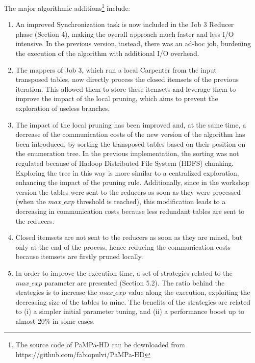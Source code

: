 \documentclass[12pt, onecolumn,letterpaper]{article}
\begin{document}
The major algorithmic additions\footnote{The source code of PaMPa-HD can be downloaded from https://github.com/fabiopulvi/PaMPa-HD} include:
\begin{enumerate}
\item An improved Synchronization task is now included in the Job 3 Reducer
phase (Section 4), making the overall approach much faster and less I/O
intensive.
In the previous version, instead, there was an ad-hoc job, burdening the
execution of the algorithm with additional I/O overhead.
\item The mappers of Job 3, which run a local Carpenter from the input
transposed tables, now directly process the closed itemsets of the previous
iteration. This allowed them to store these itemsets and leverage them to
improve the impact of the local pruning, which aims to prevent the exploration
of useless branches.
\item The impact of the local pruning has been improved and, at the same time, a
decrease of the communication costs of the new version of the algorithm has been
introduced, by sorting the transposed tables based on their position on the
enumeration tree. In the previous implementation, the sorting was not regulated
because of Hadoop Distributed File System (HDFS) chunking. Exploring the tree in
this way is more similar to a centralized exploration, enhancing the impact of
the pruning rule. Additionally, since in the workshop version the tables were
sent to the reducers as soon as they were processed (when the $max\_exp$
threshold is reached), this modification leads to a decreasing in communication
costs because less redundant tables are sent to the reducers.
\item Closed itemsets are not sent to the reducers as soon as they are mined,
but only at the end of the process, hence reducing the communication costs
because itemsets are firstly pruned locally.
\item In order to improve the execution time, a set of strategies related to the
$max\_exp$ parameter are presented (Section 5.2). The ratio behind the
strategies is to increase the $max\_exp$ value along the execution, exploiting
the decreasing size of the tables to mine. The benefits of the strategies are
related to (i) a simpler initial parameter tuning, and (ii) a performance boost
up to almost 20\% in some cases.

\end{enumerate}
\end{document}
